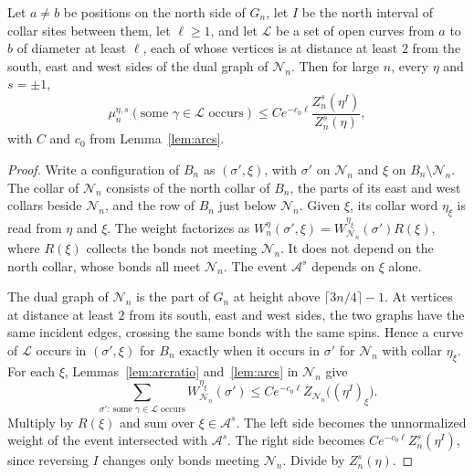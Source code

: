 \begin{lemma}\label{lem:strip}
Let $a\ne b$ be positions on the north side of $G_n$, let $I$ be the north interval of collar sites between them, let $\ell\ge1$, and let $\mathcal L$ be a set of open curves from $a$ to $b$ of diameter at least $\ell$, each of whose vertices is at distance at least $2$ from the south, east and west sides of the dual graph of $\mathcal N_n$. Then for large $n$, every $\eta$ and $s=\pm1$,
\begin{equation}\label{eq:strip}
 \mu_n^{\eta,s}(\text{some }\gamma\in\mathcal L\text{ occurs})
 \le Ce^{-c_0\ell}\frac{Z_n^s(\eta^I)}{Z_n^s(\eta)},
\end{equation}
with $C$ and $c_0$ from Lemma~\ref{lem:arcs}.
\end{lemma}
\begin{proof}
Write a configuration of $B_n$ as $(\sigma',\xi)$, with $\sigma'$ on $\mathcal N_n$ and $\xi$ on $B_n\setminus\mathcal N_n$. The collar of $\mathcal N_n$ consists of the north collar of $B_n$, the parts of its east and west collars beside $\mathcal N_n$, and the row of $B_n$ just below $\mathcal N_n$. Given $\xi$, its collar word $\eta_\xi$ is read from $\eta$ and $\xi$. The weight factorizes as $W_n^\eta(\sigma',\xi)=W_{\mathcal N_n}^{\eta_\xi}(\sigma')R(\xi)$, where $R(\xi)$ collects the bonds not meeting $\mathcal N_n$. It does not depend on the north collar, whose bonds all meet $\mathcal N_n$. The event $\mathcal A^s$ depends on $\xi$ alone.

The dual graph of $\mathcal N_n$ is the part of $G_n$ at height above $\lceil3n/4\rceil-1$. At vertices at distance at least $2$ from its south, east and west sides, the two graphs have the same incident edges, crossing the same bonds with the same spins. Hence a curve of $\mathcal L$ occurs in $(\sigma',\xi)$ for $B_n$ exactly when it occurs in $\sigma'$ for $\mathcal N_n$ with collar $\eta_\xi$. For each $\xi$, Lemmas~\ref{lem:arcratio} and~\ref{lem:arcs} in $\mathcal N_n$ give
\[
 \sum_{\sigma':\,\text{some }\gamma\in\mathcal L\text{ occurs}}W_{\mathcal N_n}^{\eta_\xi}(\sigma')
 \le Ce^{-c_0\ell}Z_{\mathcal N_n}\big((\eta^I)_\xi\big).
\]
Multiply by $R(\xi)$ and sum over $\xi\in\mathcal A^s$. The left side becomes the unnormalized weight of the event intersected with $\mathcal A^s$. The right side becomes $Ce^{-c_0\ell}Z_n^s(\eta^I)$, since reversing $I$ changes only bonds meeting $\mathcal N_n$. Divide by $Z_n^s(\eta)$.
\end{proof}

